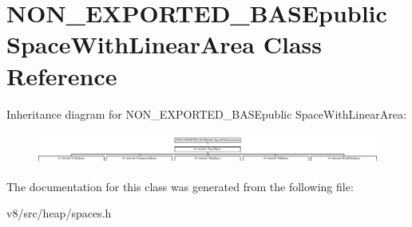\hypertarget{classNON__EXPORTED__BASEpublic_01SpaceWithLinearArea}{}\section{N\+O\+N\+\_\+\+E\+X\+P\+O\+R\+T\+E\+D\+\_\+\+B\+A\+S\+Epublic Space\+With\+Linear\+Area Class Reference}
\label{classNON__EXPORTED__BASEpublic_01SpaceWithLinearArea}
Inheritance diagram for N\+O\+N\+\_\+\+E\+X\+P\+O\+R\+T\+E\+D\+\_\+\+B\+A\+S\+Epublic Space\+With\+Linear\+Area\+:\begin{figure}[H]
\begin{center}
\leavevmode
\includegraphics[height=1.033846cm]{classNON__EXPORTED__BASEpublic_01SpaceWithLinearArea}
\end{center}
\end{figure}


The documentation for this class was generated from the following file\+:\begin{DoxyCompactItemize}
\item 
v8/src/heap/spaces.\+h\end{DoxyCompactItemize}

